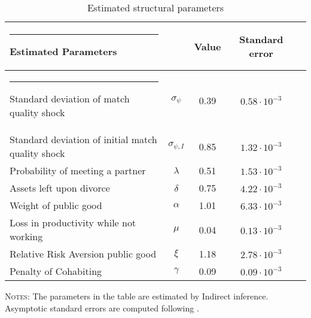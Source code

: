 \documentclass[12pt]{article}
\numberwithin{table}{section}
\begin{document}
\begin{table}[H]
\caption{\\Estimated structural parameters} %
\label{table:structural_params}
\centering %
\begin{threeparttable}
\begin{tabular}{@{\extracolsep{5pt}}lcccc}   %
\hline \hline%
\rule{-4pt}{2.5ex}
Estimated Parameters &  & Value & Standard error &\\ [0.45ex] %
\hline
\rule{-4pt}{2.5ex}
Standard deviation of match quality shock         & $\sigma_{\psi}$  & 0.39 &  $0.58\cdot 10^{-3}$&\\[0.45ex]
Standard deviation of initial match quality shock & $\sigma_{\psi,I}$         & 0.85  &  $1.32\cdot 10^{-3}$&\\[0.45ex]
Probability of meeting a partner               & $\lambda$       & 0.51 & $1.53\cdot 10^{-3}$ &\\[0.45ex]
Assets left upon divorce                                 & $\delta$             & 0.75  &  $4.22\cdot 10^{-3}$&\\[0.45ex]
Weight of public good               & $\alpha$             & 1.01 &  $6.33\cdot 10^{-3}$&\\[0.45ex]
Loss in productivity while not working               & $\mu$             & 0.04 &  $0.13\cdot 10^{-3}$&\\[0.45ex]
Relative Risk Aversion public good          &$\xi$   & 1.18& $2.78\cdot 10^{-3}$&\\[0.45ex]
Penalty of Cohabiting          &$\gamma$   & 0.09&  $0.09\cdot 10^{-3}$&\\[0.45ex]
\hline
\end{tabular}
\begin{tablenotes}[flushleft]
\footnotesize{\item \textsc{Notes}: The parameters in the table are estimated by Indirect inference. Asymptotic standard errors are computed following \cite{adda2003}.}
\end{tablenotes}
\end{threeparttable}
\end{table}
\FloatBarrier
\end{document}
